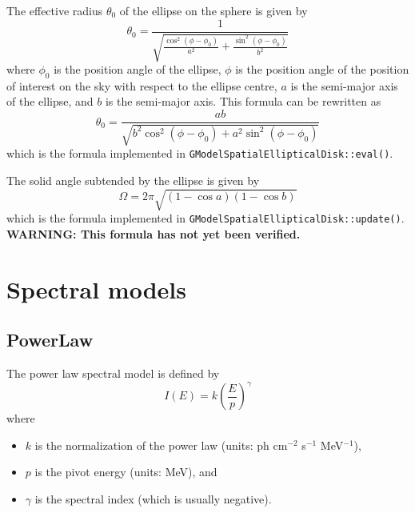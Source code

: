 \documentclass{article}[12pt,a4]
\begin{document}
The effective radius $\theta_0$ of the ellipse on the sphere is given by
\begin{equation}
\theta_0 = \frac{1}{\sqrt{\frac{\cos^2(\phi-\phi_0)}{a^2} + \frac{\sin^2(\phi-\phi_0)}{b^2}}}
\end{equation}
where
$\phi_0$ is the position angle of the ellipse,
$\phi$ is the position angle of the position of interest on the sky with respect to the ellipse centre,
$a$ is the semi-major axis of the ellipse, and
$b$ is the semi-major axis.
This formula can be rewritten as
\begin{equation}
\theta_0 = \frac{ab}{\sqrt{b^2 \cos^2(\phi-\phi_0) + a^2 \sin^2(\phi-\phi_0)}}
\end{equation}
which is the formula implemented in {\tt GModelSpatialEllipticalDisk::eval()}.

The solid angle subtended by the ellipse is given by 
\begin{equation}
\Omega = 2 \pi \sqrt{(1-\cos a) (1-\cos b)}
\end{equation}
which is the formula implemented in {\tt GModelSpatialEllipticalDisk::update()}.
{\bf WARNING: This formula has not yet been verified.}


\section{Spectral models}

\subsection{PowerLaw}

The power law spectral model is defined by
\begin{equation}
I(E) = k \left( \frac{E}{p} \right)^{\gamma}
\end{equation}
where
\begin{itemize}
\item $k$ is the normalization of the power law (units: ph cm$^{-2}$ s$^{-1}$ MeV$^{-1}$),
\item $p$ is the pivot energy (units: MeV), and
\item $\gamma$ is the spectral index (which is usually negative).
\end{itemize}
\end{document}
